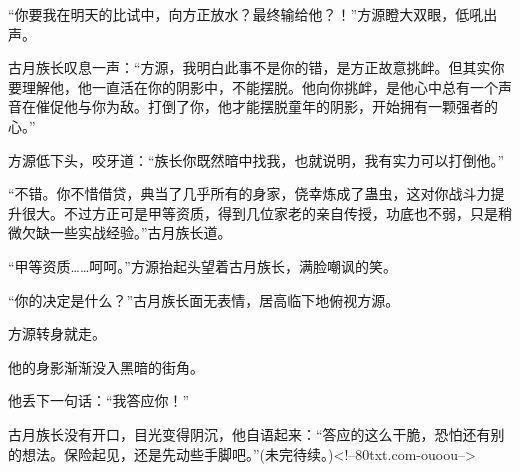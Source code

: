 \begin{this_body}
“你要我在明天的比试中，向方正放水？最终输给他？！”方源瞪大双眼，低吼出声。

古月族长叹息一声：“方源，我明白此事不是你的错，是方正故意挑衅。但其实你要理解他，他一直活在你的阴影中，不能摆脱。他向你挑衅，是他心中总有一个声音在催促他与你为敌。打倒了你，他才能摆脱童年的阴影，开始拥有一颗强者的心。”

方源低下头，咬牙道：“族长你既然暗中找我，也就说明，我有实力可以打倒他。”

“不错。你不惜借贷，典当了几乎所有的身家，侥幸炼成了蛊虫，这对你战斗力提升很大。不过方正可是甲等资质，得到几位家老的亲自传授，功底也不弱，只是稍微欠缺一些实战经验。”古月族长道。

“甲等资质……呵呵。”方源抬起头望着古月族长，满脸嘲讽的笑。

“你的决定是什么？”古月族长面无表情，居高临下地俯视方源。

方源转身就走。

他的身影渐渐没入黑暗的街角。

他丢下一句话：“我答应你！”

古月族长没有开口，目光变得阴沉，他自语起来：“答应的这么干脆，恐怕还有别的想法。保险起见，还是先动些手脚吧。”(未完待续。)<!--80txt.com-ouoou-->

\end{this_body}

